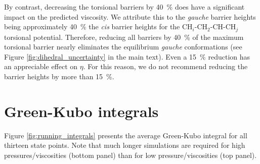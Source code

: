 \documentclass[preprint,review,11pt]{elsarticle}
\begin{document}
	By contrast, decreasing the torsional barriers by 40~\% does have a significant impact on the predicted viscosity. We attribute this to the \textit{gauche} barrier heights being approximately 40~\% the \textit{cis} barrier heights for the CH$_i$-CH$_2$-CH-CH$_j$ torsional potential. Therefore, reducing all barriers by 40~\% of the maximum torsional barrier nearly eliminates the equilibrium \textit{gauche} conformations (see Figure \ref{fig:dihedral_uncertainty} in the main text). Even a 15~\% reduction has an appreciable effect on $\eta$. For this reason, we do not recommend reducing the barrier heights by more than 15~\%.	
	
	\clearpage
	\newpage
	
	\section{Green-Kubo integrals} \label{SI:Running integrals}
		
	Figure \ref{fig:running_integrals} presents the average Green-Kubo integral for all thirteen state points. Note that much longer simulations are required for high pressures/viscosities (bottom panel) than for low pressure/viscosities (top panel). 	
	
\end{document}
